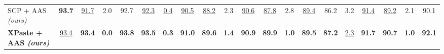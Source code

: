 \begin{tabular}{l ccc ccc ccc ccc ccc ccc c}
\midrule
\rowcolor{oursrow} SCP + AAS \emph{(ours)} & \textbf{93.7} & \underline{91.7} & 2.0 & 92.7 & \underline{92.3} & \underline{0.4} & \underline{90.5} & \underline{88.2} & 2.3 & \underline{90.6} & \underline{87.8} & 2.8 & \underline{89.4} & 86.2 & 3.2 & \underline{91.4} & \underline{89.2} & 2.1 & 90.1 \\
\rowcolor{oursrow} \textbf{XPaste + AAS \emph{(ours)}} & \underline{93.4} & \textbf{93.4} & \textbf{0.0} & \textbf{93.8} & \textbf{93.5} & \textbf{0.3} & \textbf{91.0} & \textbf{89.6} & \textbf{1.4} & \textbf{90.9} & \textbf{89.9} & \textbf{1.0} & \textbf{89.5} & \textbf{87.2} & \underline{2.3} & \textbf{91.7} & \textbf{90.7} & \textbf{1.0} & \textbf{92.1} \\
\bottomrule
\end{tabular}
